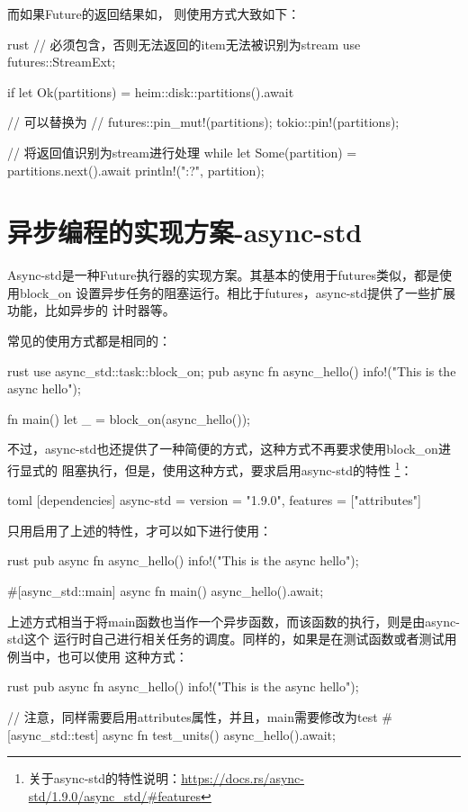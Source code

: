 而如果Future的返回结果如，
则使用方式大致如下：
\begin{code-block}{rust}
// 必须包含，否则无法返回的item无法被识别为stream
use futures::StreamExt;

if let Ok(partitions) = heim::disk::partitions().await {

    // 可以替换为
    // futures::pin_mut!(partitions);
    tokio::pin!(partitions);

    // 将返回值识别为stream进行处理
    while let Some(partition) = partitions.next().await {
        println!("{:?}", partition);
    }
}
\end{code-block}

\section{异步编程的实现方案-async-std}
Async-std是一种Future执行器的实现方案。其基本的使用于futures类似，都是使用block\_on
设置异步任务的阻塞运行。相比于futures，async-std提供了一些扩展功能，比如异步的
计时器等。

常见的使用方式都是相同的：
\begin{code-block}{rust}
use async_std::task::block_on;
pub async fn async_hello() {
    info!("This is the async hello");
}

fn main() {
    let _ = block_on(async_hello());
}

\end{code-block}

不过，async-std也还提供了一种简便的方式，这种方式不再要求使用block\_on进行显式的
阻塞执行，但是，使用这种方式，要求启用async-std的特性
\footnote{关于async-std的特性说明：\url{https://docs.rs/async-std/1.9.0/async_std/\#features}}：
\begin{code-block}{toml}
[dependencies]
async-std = {version = "1.9.0", features = ["attributes"]}
\end{code-block}
只用启用了上述的特性，才可以如下进行使用：
\begin{code-block}{rust}
pub async fn async_hello() {
    info!("This is the async hello");
}

#[async_std::main]
async fn main() {
    async_hello().await;
}
\end{code-block}
上述方式相当于将main函数也当作一个异步函数，而该函数的执行，则是由async-std这个
运行时自己进行相关任务的调度。同样的，如果是在测试函数或者测试用例当中，也可以使用
这种方式：
\begin{code-block}{rust}
pub async fn async_hello() {
    info!("This is the async hello");
}

// 注意，同样需要启用attributes属性，并且，main需要修改为test
#[async_std::test]
async fn test_units() {
    async_hello().await;
}
\end{code-block}

